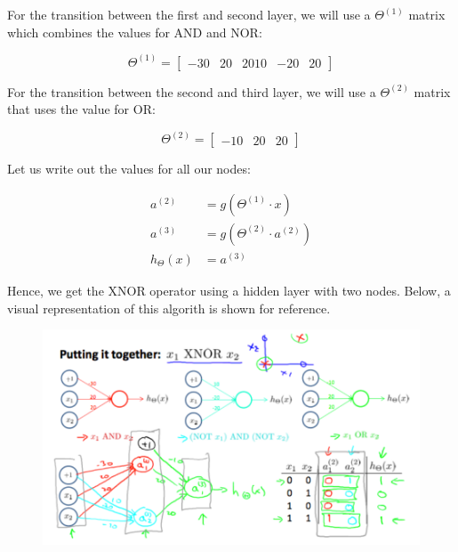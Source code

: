 \documentclass{article}
\begin{document}
        \noindent For the transition between the first and second layer, we will use a $\Theta^{(1)}$ matrix
        which combines the values for AND and NOR:

        \begin{equation*}
            \Theta^{(1)} =
            \begin{bmatrix}
                -30 & 20 & 2010 & -20 & 20
            \end{bmatrix}
        \end{equation*}

        \noindent For the transition between the second and third layer, we will use a $\Theta^{(2)}$ matrix
        that uses the value for OR:

        \begin{equation*}
            \Theta^{(2)} =
            \begin{bmatrix}
                -10 & 20 & 20
            \end{bmatrix}
        \end{equation*}

        \noindent Let us write out the values for all our nodes:

        \begin{align*}
            a^{(2)}         &= g\left(\Theta^{(1)}\cdot x\right) \\
            a^{(3)}         &= g\left(\Theta^{(2)}\cdot a^{(2)}\right) \\
            h_\Theta (x)    &= a^{(3)}
        \end{align*}

        \noindent Hence, we get the XNOR operator using a hidden layer with two nodes. Below, a visual
        representation of this algorith is shown for reference.

        \begin{figure}[hbt!]
            \centering
            \includegraphics[scale=0.75]{Resources/XNOR}
        \end{figure}
\end{document}
